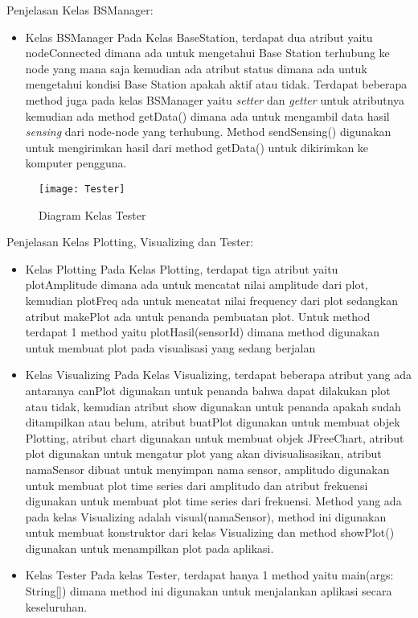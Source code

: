 Penjelasan Kelas BSManager:
\begin{itemize}
	\item Kelas BSManager
	Pada Kelas BaseStation, terdapat dua atribut yaitu nodeConnected dimana ada untuk mengetahui Base Station terhubung ke node yang mana saja kemudian ada atribut status dimana ada untuk mengetahui kondisi Base Station apakah aktif atau tidak. Terdapat beberapa method juga pada kelas BSManager yaitu \textit{setter} dan \textit{getter} untuk atributnya kemudian ada method getData() dimana ada untuk mengambil data hasil \textit{sensing} dari node-node yang terhubung. Method sendSensing() digunakan untuk mengirimkan hasil dari method getData() untuk dikirimkan ke komputer pengguna. 
\end{itemize}

\begin{figure}[H] 
		\centering  
		\texttt{[image: Tester]}  
		\caption[Diagram Kelas Tester]{Diagram Kelas Tester}
		\label{fig:use_case} 
\end{figure}

Penjelasan Kelas Plotting, Visualizing dan Tester:
\begin{itemize}
	\item Kelas Plotting
	Pada Kelas Plotting, terdapat tiga atribut yaitu plotAmplitude dimana ada untuk mencatat nilai amplitude dari plot, kemudian plotFreq ada untuk mencatat nilai frequency dari plot sedangkan atribut makePlot ada untuk penanda pembuatan plot. Untuk method terdapat 1 method yaitu plotHasil(sensorId) dimana method digunakan untuk membuat plot pada visualisasi yang sedang berjalan
	
	\item Kelas Visualizing
	Pada Kelas Visualizing, terdapat beberapa atribut yang ada antaranya canPlot digunakan untuk penanda bahwa dapat dilakukan plot atau tidak, kemudian atribut show digunakan untuk penanda apakah sudah ditampilkan atau belum, atribut buatPlot digunakan untuk membuat objek Plotting, atribut chart digunakan untuk membuat objek JFreeChart, atribut plot digunakan untuk mengatur plot yang akan divisualisasikan, atribut namaSensor dibuat untuk menyimpan nama sensor, amplitudo digunakan untuk membuat plot time series dari amplitudo dan atribut frekuensi digunakan untuk membuat plot time series dari frekuensi. Method yang ada pada kelas Visualizing adalah visual(namaSensor), method ini digunakan untuk membuat konstruktor dari kelas Visualizing dan method showPlot() digunakan untuk menampilkan plot pada aplikasi.
	
	\item Kelas Tester
	Pada kelas Tester, terdapat hanya 1 method yaitu main(args: String[]) dimana method ini digunakan untuk menjalankan aplikasi secara keseluruhan.
\end{itemize}

